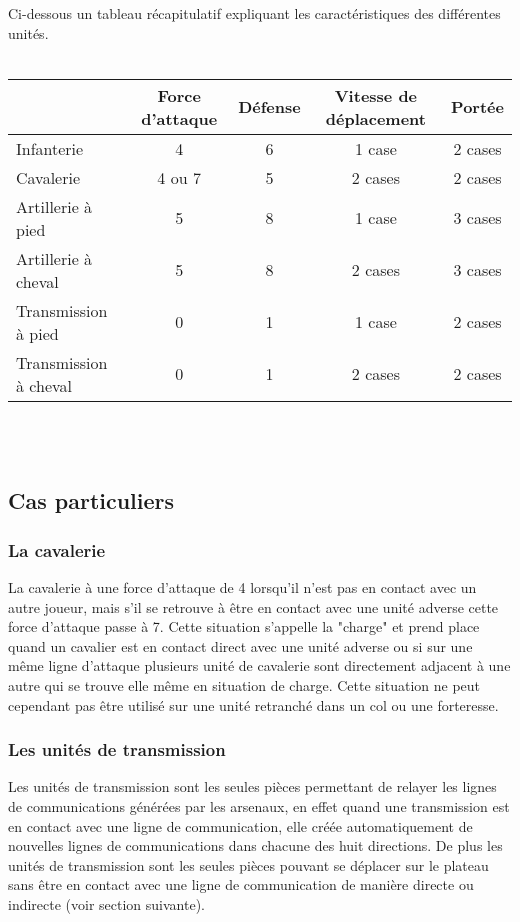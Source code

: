     Ci-dessous un tableau récapitulatif expliquant les caractéristiques des différentes unités. \\\\ 
    
   \begin{tabular}{|l|c|c|c|c|}
   \hline
    & Force d'attaque & Défense & Vitesse de déplacement & Portée\\ \hline  
   Infanterie & 4 & 6 & 1 case & 2 cases\\ \hline
   Cavalerie & 4 ou 7 & 5 & 2 cases & 2 cases\\ \hline
   Artillerie à pied & 5 & 8 & 1 case & 3 cases\\ \hline
   Artillerie à cheval & 5 & 8 & 2 cases & 3 cases\\ \hline
   Transmission à pied & 0 & 1 & 1 case & 2 cases\\ \hline
   Transmission à cheval & 0 & 1 & 2 cases & 2 cases\\ \hline
   \end{tabular} \\\\
   
      
	\subsection*{Cas particuliers}
		\subsubsection{La cavalerie}

   La cavalerie à une force d'attaque de 4 lorsqu'il n'est pas en contact avec un autre joueur, mais s'il se retrouve à être en contact avec une unité adverse cette force d'attaque passe à 7. Cette situation s'appelle la "charge" et prend place quand un cavalier est en contact direct avec une unité adverse ou si sur une même ligne d'attaque plusieurs unité de cavalerie sont directement adjacent à une autre qui se trouve elle même en situation de charge. Cette situation ne peut cependant pas être utilisé sur une unité retranché dans un col ou une forteresse.\\

		\subsubsection{Les unités de transmission}
   
   Les unités de transmission sont les seules pièces permettant de relayer les lignes de communications générées par les arsenaux, en effet quand une transmission est en contact avec une ligne de communication, elle créée automatiquement de nouvelles lignes de communications dans chacune des huit directions. 
   De plus les unités de transmission sont les seules pièces pouvant se déplacer sur le plateau sans être en contact avec une ligne de communication de manière directe ou indirecte (voir section suivante).
   
